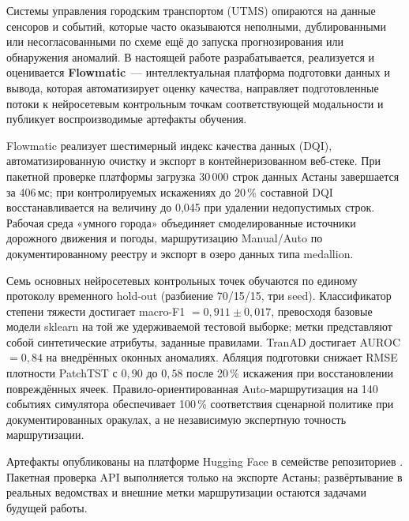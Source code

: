 Системы управления городским транспортом (UTMS) опираются на данные сенсоров и событий, которые часто оказываются неполными, дублированными или несогласованными по схеме ещё до запуска прогнозирования или обнаружения аномалий. В настоящей работе разрабатывается, реализуется и оценивается \textbf{Flowmatic}~--- интеллектуальная платформа подготовки данных и вывода, которая автоматизирует оценку качества, направляет подготовленные потоки к нейросетевым контрольным точкам соответствующей модальности и публикует воспроизводимые артефакты обучения.

Flowmatic реализует шестимерный индекс качества данных (DQI), автоматизированную очистку и экспорт в контейнеризованном веб-стеке. При пакетной проверке платформы загрузка 30\,000 строк данных Астаны завершается за 406\,мс; при контролируемых искажениях до 20\,\% составной DQI восстанавливается на величину до 0{,}045 при удалении недопустимых строк. Рабочая среда «умного города» объединяет смоделированные источники дорожного движения и погоды, маршрутизацию Manual/Auto по документированному реестру и экспорт в озеро данных типа medallion.

Семь основных нейросетевых контрольных точек обучаются по единому протоколу временного hold-out (разбиение 70/15/15, три seed). Классификатор степени тяжести достигает macro-F1 $= 0{,}911 \pm 0{,}017$, превосходя базовые модели sklearn на той же удерживаемой тестовой выборке; метки представляют собой синтетические атрибуты, заданные правилами. TranAD достигает AUROC $= 0{,}84$ на внедрённых оконных аномалиях. Абляция подготовки снижает RMSE плотности PatchTST с $0{,}90$ до $0{,}58$ после 20\,\% искажения при восстановлении повреждённых ячеек. Правило-ориентированная Auto-маршрутизация на 140 событиях симулятора обеспечивает 100\,\% соответствия сценарной политике при документированных оракулах, а не независимую экспертную точность маршрутизации.

Артефакты опубликованы на платформе Hugging Face в семействе репозиториев \flowmaticrepo{}. Пакетная проверка API выполняется только на экспорте Астаны; развёртывание в реальных ведомствах и внешние метки маршрутизации остаются задачами будущей работы.

